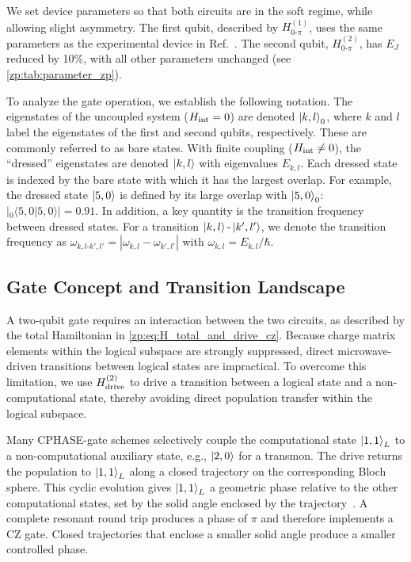 We set device parameters so that both \zps circuits are in the soft regime, while allowing slight asymmetry.
The first qubit, described by $H_{0\text{-}\pi}^{(1)}$, uses the same parameters as the experimental device in Ref.~\cite{Gyenis_zero_pi_2021a}.
The second qubit, $H_{0\text{-}\pi}^{(2)}$, has $E_J$ reduced by 10\%, with all other parameters unchanged (see \cref{zp:tab:parameter_zp}).

To analyze the gate operation, we establish the following notation.
The eigenstates of the uncoupled system ($H_{\rm int} = 0$) are denoted $\ket{k,l}_0$, where $k$ and $l$ label the eigenstates of the first and second qubits, respectively.
These are commonly referred to as bare states.
With finite coupling ($H_{\rm int}\ne 0$), the ``dressed'' eigenstates are denoted $\ket{k,l}$ with eigenvalues $E_{k,l}$.
Each dressed state is indexed by the bare state with which it has the largest overlap.
For example, the dressed state $\ket{5,0}$ is defined by its large overlap with $\ket{5,0}_0$: $\left|{}_0\!\langle 5,0| 5,0 \rangle \right|=0.91$.
In addition, a key quantity is the transition frequency between dressed states.
For a transition $\ket{k,l}\text{-}\ket{k',l'}$, we denote the transition frequency as  $\omega_{k,l\text{-} k',l'} = |\omega_{k,l}-\omega_{k',l'}|$ with $\omega_{k,l}= E_{k,l}/\hbar$.

\subsection{Gate Concept and Transition Landscape}\label{zp:sec:cz_gate_transition}
A two-qubit gate requires an interaction between the two \zps circuits, as described by the total Hamiltonian in \cref{zp:eq:H_total_and_drive_cz}.
Because charge matrix elements within the logical subspace are strongly suppressed, direct microwave-driven transitions between logical states are impractical.
To overcome this limitation, we use $H_{\rm drive}^{(2)}$ to drive a transition between a logical state and a non-computational state, thereby avoiding direct population transfer within the logical subspace.

Many CPHASE-gate schemes selectively couple the computational state $\ket{1,1}_L$ to a non-computational auxiliary state, e.g.,  $\ket{2,0}$ for a transmon.
The drive returns the population to $\ket{1,1}_L$ along a closed trajectory on the corresponding Bloch sphere.
This cyclic evolution gives $\ket{1,1}_L$ a geometric phase relative to the other computational states, set by the solid angle enclosed by the trajectory~\cite{nesterov2018microwave,ficheux2021fast}.
A complete resonant round trip produces a phase of $\pi$ and therefore implements a CZ gate.
Closed trajectories that enclose a smaller solid angle produce a smaller controlled phase.

